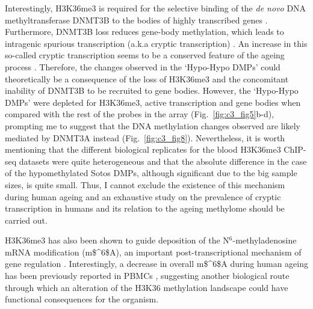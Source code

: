 \bigskip

Interestingly, H3K36me3 is required for the selective binding of the \textit{de novo} DNA methyltransferase DNMT3B to the bodies of highly transcribed genes \cite{Baubec2015}. Furthermore, DNMT3B loss reduces gene-body methylation, which leads to intragenic spurious transcription (a.k.a cryptic transcription) \cite{Neri2017}. An increase in this so-called cryptic transcription seems to be a conserved feature of the ageing process \cite{Sen2015}. Therefore, the changes observed in the `Hypo-Hypo DMPs' could theoretically be a consequence of the loss of H3K36me3 and the concomitant inability of DNMT3B to be recruited to gene bodies. However, the `Hypo-Hypo DMPs' were depleted for H3K36me3, active transcription and gene bodies when compared with the rest of the probes in the array (Fig.~\ref{fig:c3_fig5}b-d), prompting me to suggest that the DNA methylation changes observed are likely mediated by DNMT3A instead (Fig.~\ref{fig:c3_fig8}). Nevertheless, it is worth mentioning that the different biological replicates for the blood H3K36me3 ChIP-seq datasets were quite heterogeneous and that the absolute difference in the case of the hypomethylated Sotos DMPs, although significant due to the big sample sizes, is quite small. Thus, I cannot exclude the existence of this mechanism during human ageing and an exhaustive study on the prevalence of cryptic transcription in humans and its relation to the ageing methylome should be carried out.

\bigskip

H3K36me3 has also been shown to guide deposition of the N$^6$-methyladenosine \acrshort{mRNA} modification (\acrshort{m$^6$A}), an important post-transcriptional mechanism of gene regulation \cite{Huang2019}. Interestingly, a decrease in overall \acrshort{m$^6$A} during human ageing has been previously reported in \acrshort{PBMC}s \cite{Min2018}, suggesting another biological route through which an alteration of the H3K36 methylation landscape could have functional consequences for the organism.

\bigskip

